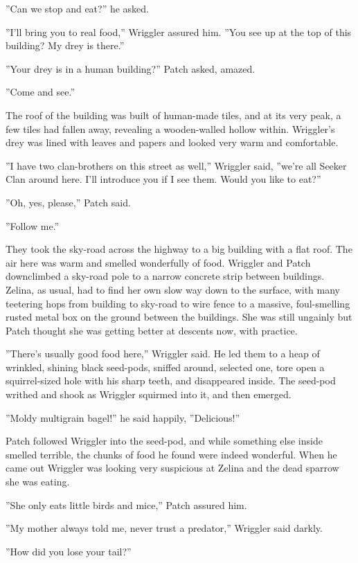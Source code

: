\documentclass[11pt]{article}
\begin{document}
 ''Can we stop and eat?'' he asked.\par
 ''I'll bring you to real food,'' Wriggler assured him. ''You see up at the top of this building? My drey is there.''\par
 ''Your drey is in a human building?'' Patch asked, amazed.\par
''Come and see.''\par
The roof of the building was built of human-made tiles, and at its very peak, a few tiles had fallen away, revealing a wooden-walled hollow within. Wriggler's drey was lined with leaves and papers and looked very warm and comfortable.\par
''I have two clan-brothers on this street as well,'' Wriggler said, ''we're all Seeker Clan around here. I'll introduce you if I see them. Would you like to eat?''\par
''Oh, yes, please,'' Patch said.\par
''Follow me.''\par
They took the sky-road across the highway to a big building with a flat roof. The air here was warm and smelled wonderfully of food. Wriggler and Patch downclimbed a sky-road pole to a narrow concrete strip between buildings. Zelina, as usual, had to find her own slow way down to the surface, with many teetering hops from building to sky-road to wire fence to a massive, foul-smelling rusted metal box on the ground between the buildings. She was still ungainly but Patch thought she was getting better at descents now, with practice.\par
''There's usually good food here,'' Wriggler said. He led them to a heap of wrinkled, shining black seed-pods, sniffed around, selected one, tore open a squirrel-sized hole with his sharp teeth, and disappeared inside. The seed-pod writhed and shook as Wriggler squirmed into it, and then emerged.\par
 ''Moldy multigrain bagel!'' he said happily, ''Delicious!''\par
 Patch followed Wriggler into the seed-pod, and while something else inside smelled terrible, the chunks of food he found were indeed wonderful. When he came out Wriggler was looking very suspicious at Zelina and the dead sparrow she was eating.\par
 ''She only eats little birds and mice,'' Patch assured him.\par
 ''My mother always told me, never trust a predator,'' Wriggler said darkly.\par
 ''How did you lose your tail?''\par
\end{document}
